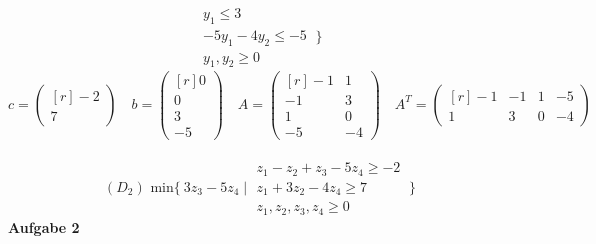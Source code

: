 \documentclass[a4paper,10pt]{article}
\begin{document}
\begin{enumerate}[a)]
\[\begin{matrix}
		y_1 \leq 3\\
		-5y_1 - 4y_2 \leq -5\\
		y_1, y_2 \geq 0
	\end{matrix}
	\ \}
	\]
	\[
	c = 
	\begin{pmatrix*}[r]
		-2\\
		7
	\end{pmatrix*}
	\quad
	b = 
	\begin{pmatrix*}[r]
		0\\
		0\\
		3\\
		-5
	\end{pmatrix*}
	\quad
	A = 
	\begin{pmatrix*}[r]
		-1 & 1\\
		-1 & 3\\
		1  & 0\\
		-5 & -4
	\end{pmatrix*}
	\quad
	A^T =
	\begin{pmatrix*}[r]
		-1 & -1 & 1 & -5\\
		1 & 3 & 0 & -4
	\end{pmatrix*}
	\]
	\\
	\[(D_2) \text{ min} \{\ 3z_3 - 5z_4 \mid 
	\begin{matrix}
		z_1 - z_2 + z_3 - 5z_4 \geq -2\\
		z_1 + 3z_2 -4z_4 \geq 7\\
		z_1, z_2, z_3, z_4 \geq 0
	\end{matrix}
	\ \}
	\]
	\newpage
	\textbf{Aufgabe 2}
	
	
	
	\end{enumerate}
\end{document}
